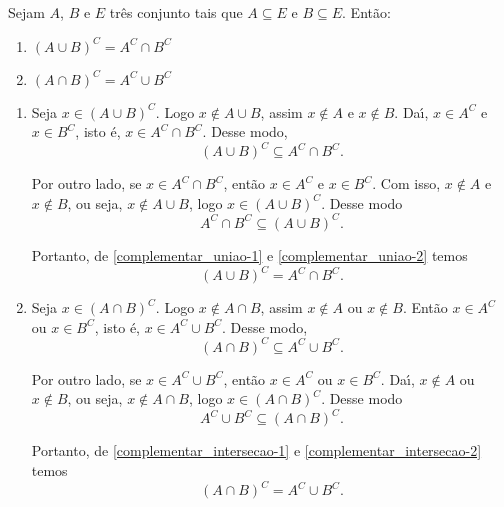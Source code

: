 \begin{proposicao} Sejam $A$, $B$ e $E$ tr{\^e}s conjunto tais que $A\subseteq E$ e $B\subseteq E$. Ent{\~a}o:
\begin{enumerate}[label={\roman*})]
	\item $(A\cup B)^C = A^C\cap B^C$
	\item $(A\cap B)^C = A^C\cup B^C$
\end{enumerate}
\end{proposicao}
\begin{prova}
	\begin{enumerate}[label={\roman*})]
		\item Seja $x \in (A\cup B)^C$. Logo $x\notin A\cup B$, assim $x\notin A$ e $x\notin B$. Da{\'\i}, $x\in A^C$ e $x\in B^C$, isto {\'e}, $x\in A^C\cap B^C$. Desse modo,
		\begin{equation}\label{complementar_uniao-1}
			(A\cup B)^C \subseteq A^C\cap B^C.
		\end{equation}

		Por outro lado, se $x\in A^C\cap B^C$, ent{\~a}o $x\in A^C$ e $x\in B^C$. Com isso, $x\notin A$ e $x\notin B$, ou seja, $x\notin A\cup B$, logo $x\in (A\cup B)^C$. Desse modo
		\begin{equation}\label{complementar_uniao-2}
			A^C\cap B^C\subseteq(A\cup B)^C.
		\end{equation}

		Portanto, de \eqref{complementar_uniao-1} e \eqref{complementar_uniao-2} temos
		\[
			(A\cup B)^C = A^C\cap B^C.
		\]

		\item Seja $x \in (A\cap B)^C$. Logo $x\notin A\cap B$, assim $x\notin A$ ou $x\notin B$. Ent\~ao $x\in A^C$ ou $x\in B^C$, isto {\'e}, $x\in A^C\cup B^C$. Desse modo,
		\begin{equation}\label{complementar_intersecao-1}
			(A\cap B)^C \subseteq A^C\cup B^C.
		\end{equation}

		Por outro lado, se $x\in A^C\cup B^C$, ent{\~a}o $x\in A^C$ ou $x\in B^C$. Da{\'\i}, $x\notin A$ ou $x\notin B$, ou seja, $x\notin A\cap B$, logo $x\in (A\cap B)^C$. Desse modo
		\begin{equation}\label{complementar_intersecao-2}
			A^C\cup B^C\subseteq(A\cap B)^C.
		\end{equation}

		Portanto, de \eqref{complementar_intersecao-1} e \eqref{complementar_intersecao-2} temos
		\[
			(A\cap B)^C = A^C\cup B^C.
		\]
	\end{enumerate}
\end{prova}

